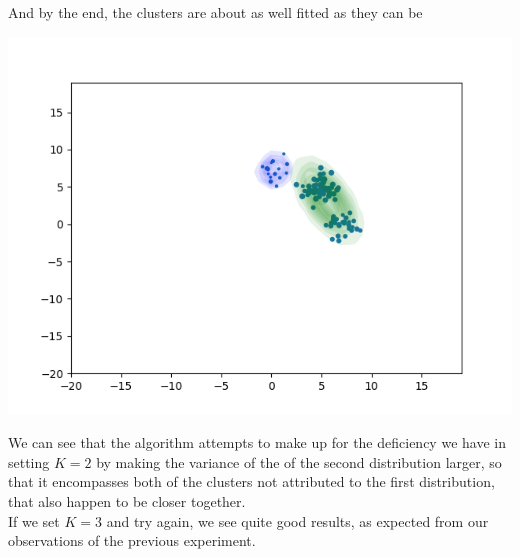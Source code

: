 \documentclass[11pt,a4paper]{article}
\begin{document}
And by the end, the clusters are about as well fitted as they can be\\

\begin{center}
\includegraphics[width=\textwidth]{3_k=2.png}
\end{center}

We can see that the algorithm attempts to make up for the deficiency we have in setting $K=2$ by making the variance of the of the second distribution larger, so that it encompasses both of the clusters not attributed to the first distribution, that also happen to be closer together.\\

If we set $K=3$ and try again, we see quite good results, as expected from our observations of the previous experiment.
\end{document}
